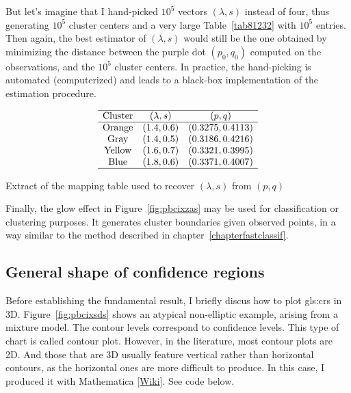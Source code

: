 \documentclass[oneside,10pt]{book}
\begin{document}
But let's imagine that I hand-picked $10^5$ vectors $(\lambda,s)$ instead of four, thus generating $10^5$ cluster centers and a very large Table~\ref{tab81232} with $10^5$ entries. Then again, the best estimator of $(\lambda,s)$ would still
be the one obtained by minimizing the distance between the purple dot $(p_0,q_0)$ computed on the observations, and the $10^5$ cluster centers. In practice, the hand-picking is automated
(computerized) and leads to a
black-box implementation of the estimation procedure.

\begin{table}[H]
\[
\begin{array}{ccc}
\hline
 \mbox{Cluster} &  (\lambda,  s) & (p, q) \\
\hline
 \mbox{Orange} & (1.4, 0.6) & (0.3275,  0.4113)\\
\mbox{Gray} & (1.4, 0.5) & (0.3186, 0.4216) \\
\mbox{Yellow} & (1.6,  0.7) & (0.3321, 0.3995)\\
\mbox{Blue} & (1.8, 0.6)&  (0.3371,  0.4007)\\
\hline
\end{array}
\]
\caption{\label{tab81232}Extract of the mapping table used to recover $(\lambda,s)$ from $(p,q)$}
\end{table}

\noindent Finally, the glow effect in Figure~\ref{fig:pbcixzas} may be used for classification or clustering purposes. It generates cluster boundaries
 given observed points, in a way similar to the method described in chapter~\ref{chapterfastclassif}.


\subsection{General shape of confidence regions}\label{generi}

Before establishing the fundamental result, I briefly discus how to plot \glspl{gls:cr} in 3D. Figure~\ref{fig:pbcixsds}
 shows an atypical non-elliptic example, arising from a \textcolor{index}{mixture model}. The \textcolor{index}{contour levels} 
correspond to \textcolor{index}{confidence levels}. This type of chart is called \textcolor{index}{contour plot}. However, in the
literature, most contour plots are 2D. And those that are 3D usually feature vertical rather than horizontal contours, as the horizontal ones
are more difficult to produce. In this case, I produced it with
\textcolor{index}{Mathematica} [\href{https://www.wolframalpha.com/}{Wiki}]. See code below.  \\
\end{document}
